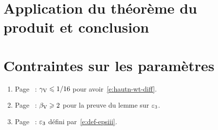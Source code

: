 
\section{Application du théorème du produit et conclusion}

\section{Contraintes sur les paramètres}

\begin{enumerate}
  \item Page~\pageref{ct:Vcos<1/16} : \( \gamma \sb{\mathrm{V}} \leqslant 1/16 \) pour
    avoir~\eqref{e:hautn-wt-diff}.
  \item Page~\pageref{ct:Vfar>2} : \( \beta \sb{\mathrm{V}} \geqslant 2 \) pour la preuve
    du lemme sur \( \varepsilon\sb3 \).
  \item Page~\pageref{e:def-epsiii} : \( \varepsilon\sb3 \) défini
    par~\eqref{e:def-epsiii}.
\end{enumerate}

\endinput

